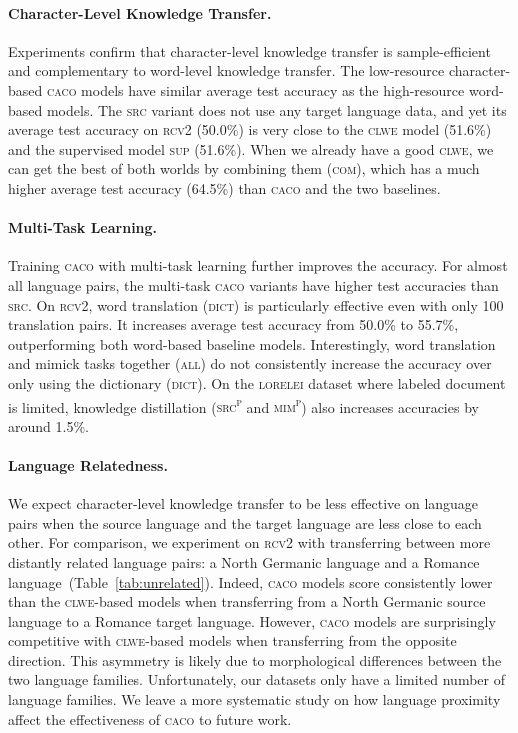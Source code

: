 \documentclass[letterpaper]{article} %
\newcommand{\abr}[1]{\textsc{#1}}
\newcommand{\name}[0]{\textsc{caco}}
\newcommand{\pp}[0]{\textsuperscript{p}}
\begin{document}
\paragraph{Character-Level Knowledge Transfer.}
Experiments confirm that character-level knowledge transfer is sample-efficient
and complementary to word-level knowledge transfer.
The low-resource character-based \name{} models have similar average test
accuracy as the high-resource word-based models.
The \abr{src} variant does not use any
target language data, and yet its average test accuracy on \abr{rcv2} (50.0\%)
is very close to the \abr{clwe} model (51.6\%) and the supervised model
\abr{sup} (51.6\%).
When we already have a good \abr{clwe}, we can get the best of both worlds by
combining them (\abr{com}), which has a much higher average test accuracy
(64.5\%) than \name{} and the two baselines.

\paragraph{Multi-Task Learning.}
Training \name{} with multi-task learning further improves the accuracy.  For
almost all language pairs, the multi-task \name{} variants have higher test
accuracies than \abr{src}.
On \abr{rcv2}, word translation (\abr{dict}) is particularly effective even
with only 100 translation pairs.
It increases average test accuracy from 50.0\% to 55.7\%, outperforming both
word-based baseline models.
Interestingly, word translation and mimick tasks together (\abr{all}) do not
consistently increase the accuracy over only using the dictionary (\abr{dict}).
On the \abr{lorelei} dataset where labeled document is limited, knowledge
distillation (\abr{src\pp{}} and \abr{mim\pp{}}) also increases
accuracies by around 1.5\%.

\paragraph{Language Relatedness.}
We expect character-level knowledge transfer to be less effective on language
pairs when the source language and the target language are less close to each
other.
For comparison, we experiment on \abr{rcv2} with transferring between more
distantly related language pairs: a North Germanic language and a Romance
language~(Table~\ref{tab:unrelated}).
Indeed, \name{} models score consistently
lower than the \abr{clwe}-based models when transferring from a North Germanic
source language to a Romance target language.  However, \name{} models are
surprisingly competitive with \abr{clwe}-based models when transferring from
the opposite direction.  This asymmetry is likely due to morphological
differences between the two language families.
Unfortunately, our datasets only have a limited number of language families.
We leave a more systematic study on how language proximity affect the
effectiveness of \name{} to future work.
\end{document}
